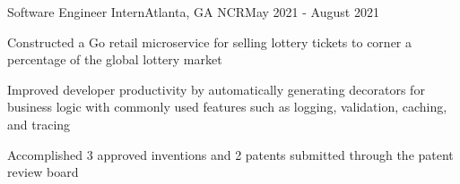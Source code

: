 \resumeSubheading
{Software Engineer Intern}{Atlanta, GA}
{NCR}{May 2021 - August 2021}
\resumeItemListStart

\resumeItem
{
  Constructed a Go retail microservice for selling lottery tickets to
  corner a percentage of the global lottery market
}

\resumeItem
{
  Improved developer productivity by automatically generating decorators
  for business logic with commonly used features such as logging, validation,
  caching, and tracing
}



\resumeItem
{
  Accomplished 3 approved inventions and 2 patents submitted through the patent review board
}

\resumeItemListEnd
